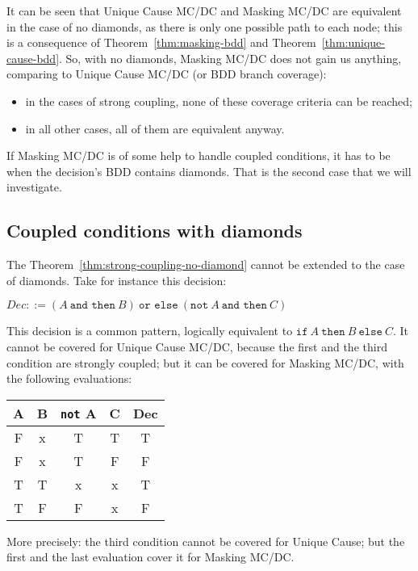 \documentclass[a4paper,12pt,twoside]{article}
\newcommand{\andthen}{\texttt{and then}}
\newcommand{\orelse}{\texttt{or else}}
\newcommand{\adanot}{\texttt{not}}
\newcommand{\adaif}{\texttt{if}}
\newcommand{\adathen}{\texttt{then}}
\newcommand{\adaelse}{\texttt{else}}
\begin{document}
It can be seen that Unique Cause MC/DC and Masking
MC/DC are equivalent in the case of no diamonds, as there is only one
possible path to each node; this is a consequence of
Theorem~\ref{thm:masking-bdd} and Theorem~\ref{thm:unique-cause-bdd}.
So, with no diamonds, Masking MC/DC does not gain us anything, comparing
to Unique Cause MC/DC (or BDD branch coverage):
\begin{itemize}
\item in the cases of strong coupling, none of these coverage criteria
can be reached;
\item in all other cases, all of them are equivalent anyway.
\end{itemize}

If Masking MC/DC is of some help to handle coupled conditions, it has to
be when the decision's BDD contains diamonds. That is the second case that
we will investigate.

\subsection{Coupled conditions with diamonds}

The Theorem~\ref{thm:strong-coupling-no-diamond} cannot be extended to the
case of diamonds. Take for instance this decision:

$Dec ::= (A \ \andthen{} \ B) \ \orelse{} \ (\adanot{} \ A \ \andthen{} \ C)$

This decision is a common pattern, logically equivalent to
$\adaif{} \ A \ \adathen{} \ B \ \adaelse \ C$. It cannot be covered for
Unique Cause MC/DC, because the first and the third condition are strongly
coupled; but it can be covered for Masking MC/DC, with the following
evaluations:

\begin{center}
\begin{tabular}{|c|c|c|c||c|}
\hline
A & B & \adanot{} A & C & Dec\\ \hline
F & x & T           & T & T \\ \hline
F & x & T           & F & F \\ \hline
T & T & x           & x & T \\ \hline
T & F & F           & x & F \\ \hline
\end{tabular}
\end{center}

More precisely: the third condition cannot be covered for Unique Cause;
but the first and the last evaluation cover it for Masking MC/DC.
\end{document}
